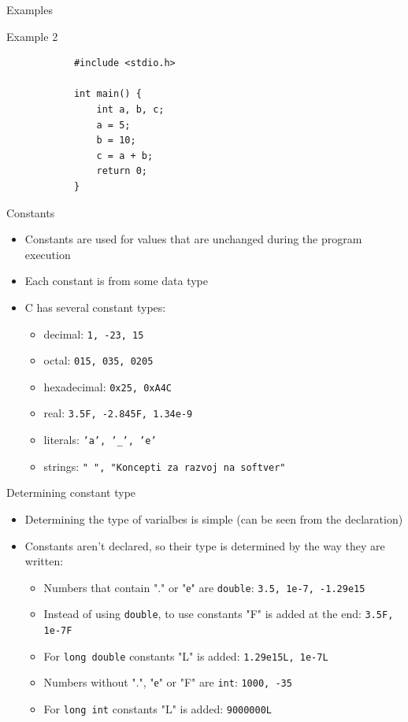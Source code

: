 \begin{frame}[fragile]{Examples}
    \begin{exampleblock}{Example 2}
        \begin{lstlisting}
            #include <stdio.h>

            int main() {
                int a, b, c;
                a = 5;
                b = 10;
                c = a + b;
                return 0;
            }
        \end{lstlisting}
    \end{exampleblock}
\end{frame}

\begin{frame}{Constants}
\begin{itemize}
\item Constants are used for values that are unchanged during the program
execution
\item Each constant is from some data type
\item C has several constant types:
\begin{itemize}
\item decimal: \texttt{1, -23, 15}
\item octal: \texttt{015, 035, 0205}
\item hexadecimal: \texttt{0x25, 0xA4C}
\item real: \texttt{3.5F, -2.845F, 1.34e-9}
\item literals: \texttt{'a', '\_', 'e'}
\item strings: \texttt{" ", "Koncepti za razvoj na softver"}
\end{itemize}
\end{itemize}
\end{frame}

\begin{frame}{Determining constant type}
\begin{itemize}
\item Determining the type of varialbes is simple (can be seen from the
declaration)
\item Constants aren't declared, so their type is determined by the
way they are written:
\begin{itemize}
\item Numbers that contain "." or "е" are
{\color{blue}\texttt{double}}:
\texttt{3.5, 1е-7, -1.29е15}
\item Instead of using \texttt{double}, to use {}
constants "F" is added at the end: \texttt{3.5F, 1e-7F}
\item For {\color{blue}\texttt{long double}} constants "L" is added:
\texttt{1.29е15L, 1e-7L}
\item Numbers without ".", "е" or "F" are {\color{blue}\texttt{int}}:
\texttt{1000, -35}
\item For {\color{blue}\texttt{long int}} constants "L" is added:
\texttt{9000000L}
\end{itemize}
\end{itemize}
\end{frame}

